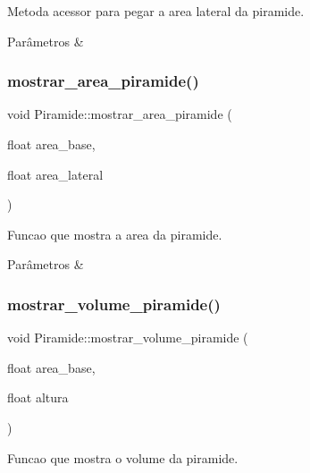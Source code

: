 Metoda acessor para pegar a area lateral da piramide. 


\begin{DoxyParams}{Parâmetros}
{\em } & \\
\hline
\end{DoxyParams}
\mbox{\label{classPiramide_a7d29435cac0fb807ab2584acc7806fe6}} 
\subsubsection{\texorpdfstring{mostrar\+\_\+area\+\_\+piramide()}{mostrar\_area\_piramide()}}
{\footnotesize\ttfamily void Piramide\+::mostrar\+\_\+area\+\_\+piramide (\begin{DoxyParamCaption}\item[{float}]{area\+\_\+base,  }\item[{float}]{area\+\_\+lateral }\end{DoxyParamCaption})}



Funcao que mostra a area da piramide. 


\begin{DoxyParams}{Parâmetros}
{\em } & \\
\hline
\end{DoxyParams}
\mbox{\label{classPiramide_a46b46e867a3acac325422627534e6902}} 
\subsubsection{\texorpdfstring{mostrar\+\_\+volume\+\_\+piramide()}{mostrar\_volume\_piramide()}}
{\footnotesize\ttfamily void Piramide\+::mostrar\+\_\+volume\+\_\+piramide (\begin{DoxyParamCaption}\item[{float}]{area\+\_\+base,  }\item[{float}]{altura }\end{DoxyParamCaption})}



Funcao que mostra o volume da piramide. 


